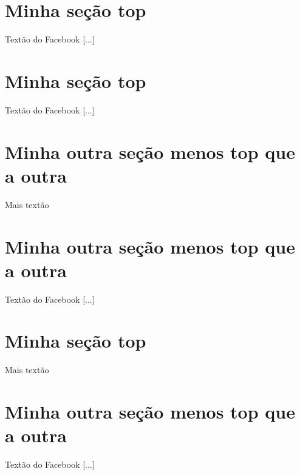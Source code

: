 \documentclass{article}
\begin{document}

\section{Minha seção top}
  Textão do Facebook [...]\\
  \lipsum[1] %
  



\section{Minha seção top}
  Textão do Facebook [...]\\
  \lipsum[1] %
  
\section{Minha outra seção menos top que a outra}
  Mais textão\\
  \lipsum[2] %




\section{Minha outra seção menos top que a outra}
  Textão do Facebook [...]\\
  \lipsum[1] %

\section{Minha seção top}
  Mais textão\\
  \lipsum[2] %




\tableofcontents 

\section{Minha outra seção menos top que a outra}
  Textão do Facebook [...]\\
  \lipsum[1] %
\end{document}
